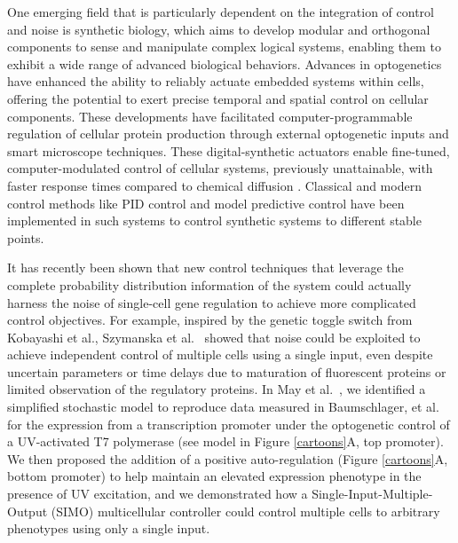 \documentclass[12pt]{iopart}
\begin{document}
One emerging field that is particularly dependent on the integration of control and noise is synthetic biology, which aims to develop modular\cite{Ng2019} and orthogonal \cite{Liu2018} components to sense and manipulate \cite{Sheets2020} complex logical systems, enabling them to exhibit a wide range of advanced biological behaviors\cite{Shin2020}. 
Advances in optogenetics have enhanced the ability to reliably actuate embedded systems within cells, offering the potential to exert precise temporal and spatial control on cellular components\cite{Sheets2020,Baumschlager2017,Chen2020,Lillacci2018}.
These developments have facilitated computer-programmable regulation of cellular protein production through external optogenetic inputs and smart microscope techniques\cite{Fox2021,Baumschlager2021,Lugagne2017}. 
These digital-synthetic actuators enable fine-tuned, computer-modulated control of cellular systems, previously unattainable, with faster response times compared to chemical diffusion\cite{Rullan2018, Baumschlager2017} . 
Classical and modern control methods like PID control and model predictive control have been implemented in such systems \cite{Filo2022}to control synthetic systems to different stable points. 

It has recently been shown that new control techniques that leverage the complete probability distribution information of the system could actually harness the noise of single-cell gene regulation to achieve more complicated control objectives. 
For example, inspired by the genetic toggle switch from Kobayashi et al.\cite{Kobayashi2004}, Szymanska et al.~\cite{Szymanska2015} showed that noise could be exploited to achieve independent control of multiple cells using a single input, even despite uncertain parameters or time delays due to maturation of fluorescent proteins or limited observation of the regulatory proteins. 
In May et al.~\cite{May2021}, we identified a simplified stochastic model to reproduce data measured in Baumschlager, et al. \cite{Baumschlager2017} for the expression from a transcription promoter under the optogenetic control of a UV-activated T7 polymerase (see model in Figure \ref{cartoons}A, top promoter).
We then proposed the addition of a positive auto-regulation (Figure \ref{cartoons}A, bottom promoter) to help maintain an elevated expression phenotype in the presence of UV excitation, and we demonstrated how a Single-Input-Multiple-Output (SIMO) multicellular controller could control multiple cells to arbitrary phenotypes using only a single input. 
\end{document}
